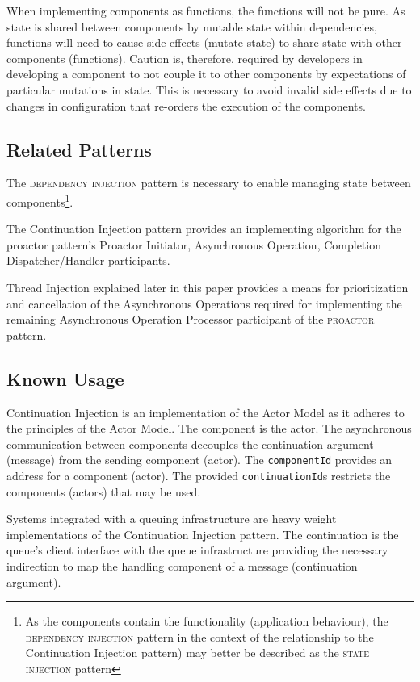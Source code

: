 \documentclass[prodmode]{style/acmlarge}
\begin{document}
When implementing components as functions, the functions will not be pure.  As
state is shared between components by mutable state within dependencies,
functions will need to cause side effects (mutate state) to share state with
other components (functions).  Caution is, therefore, required by developers in
developing a component to not couple it to other components by expectations of
particular mutations in state.  This is necessary to avoid invalid side effects
due to changes in configuration that re-orders the execution of the components.


\subsection{Related Patterns}

The \textsc{dependency injection} pattern \cite{ioc} is necessary to enable
managing state between components\footnote{As the components contain the
functionality (application behaviour), the \textsc{dependency injection} pattern
in the context of the relationship to the Continuation Injection pattern) may
better be described as the \textsc{state injection} pattern}.

The Continuation Injection pattern provides an implementing algorithm for the
{proactor} pattern's Proactor Initiator, Asynchronous Operation, Completion
Dispatcher/Handler participants.

Thread Injection explained later in this paper provides a means for
prioritization and cancellation of the Asynchronous Operations required for
implementing the remaining Asynchronous Operation Processor participant of the
\textsc{proactor} pattern.


\subsection{Known Usage}

Continuation Injection is an implementation of the Actor Model \cite{actors} as
it adheres to the principles of the Actor Model.  The component is the actor.
The asynchronous communication between components decouples the continuation
argument (message) from the sending component (actor).  The \texttt{componentId}
provides an address for a component (actor).  The provided
\texttt{continuationId}s restricts the components (actors) that may be used.

Systems integrated with a queuing infrastructure are heavy weight
implementations of the Continuation Injection pattern.  The continuation is the
queue's client interface with the queue infrastructure providing the necessary
indirection to map the handling component of a message (continuation argument).
\end{document}
